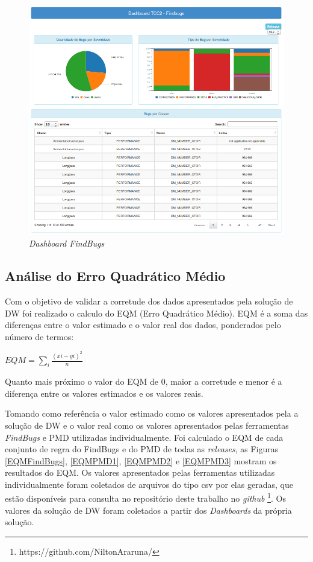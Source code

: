 \begin{figure}[H]
\centering
\includegraphics[keepaspectratio=false,scale=0.55]{figuras/figuras_nilton/DashboardFindbugs.png}
\caption{\textit{Dashboard FindBugs}}
\label{dashboardCenarios}
\end{figure}


\subsection{Análise do Erro Quadrático Médio}
\label{eqm}

Com o objetivo de validar a corretude dos dados apresentados pela solução de DW foi realizado o calculo do EQM (Erro Quadrático Médio). EQM é a soma das diferenças entre
o valor estimado e o valor real dos dados, ponderados pelo número de termos: 

$ EQM = \sum\limits_{i}\frac{(x{i}-y{i})^{2}}{n} $

Quanto mais próximo o valor do EQM de 0, maior a corretude e menor é a diferença entre os valores estimados e os valores reais.

Tomando como referência o valor estimado como os valores apresentados pela a solução de DW e o valor real como os valores apresentados pelas ferramentas \textit{FindBugs} e PMD utilizadas individualmente. Foi calculado o EQM de cada conjunto de regra do FindBugs e do PMD de todas as \textit{releases}, as Figuras \ref{EQMFindBugs}, \ref{EQMPMD1}, \ref{EQMPMD2} e \ref{EQMPMD3} mostram os resultados do EQM. Os valores apresentados pelas ferramentas utilizadas individualmente foram coletados de arquivos do tipo csv por elas geradas, que estão disponíveis para consulta no repositório deste trabalho no \textit{github} \footnote{https://github.com/NiltonAraruna/}. Os valores da solução de DW foram coletados a partir dos \textit{Dashboards} da própria solução. 

